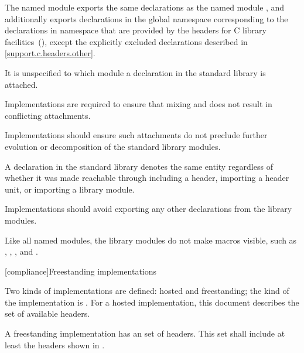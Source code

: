 \pnum
The named module  exports the same declarations as
the named module , and
additionally exports declarations in the global namespace
corresponding to the declarations in namespace 
that are provided by
the \Cpp{} headers for C library facilities~(),
except the explicitly excluded declarations
described in \ref{support.c.headers.other}.

\pnum
It is unspecified to which module a declaration in the standard library
is attached.
\begin{note}
Implementations are required to ensure that mixing
 and  does not result in
conflicting attachments.
\end{note}
\recommended
Implementations should ensure such attachments do not preclude
further evolution or decomposition of the standard library modules.

\pnum
A declaration in the standard library denotes the same entity regardless of
whether it was made reachable through
including a header,
importing a header unit, or
importing a \Cpp{} library module.

\pnum
\recommended
Implementations should avoid exporting any other declarations
from the \Cpp{} library modules.

\begin{note}
Like all named modules, the \Cpp{} library modules
do not make macros visible, such as
,
,
, and
.
\end{note}

[compliance]{Freestanding implementations}
%

\pnum
Two kinds of implementations are defined:
%
hosted and freestanding;
the kind of the implementation is
.
For a hosted implementation, this document
describes the set of available headers.

\pnum
A freestanding implementation has an
 set of headers. This set shall
include at least the headers shown in .

